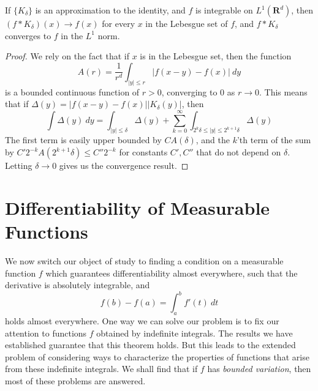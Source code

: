 \begin{theorem}
    If $\{ K_\delta \}$ is an approximation to the identity, and $f$ is integrable on $L^1(\mathbf{R}^d)$, then $(f * K_\delta)(x) \to f(x)$ for every $x$ in the Lebesgue set of $f$, and $f * K_\delta$ converges to $f$ in the $L^1$ norm.
\end{theorem}
\begin{proof}
    We rely on the fact that if $x$ is in the Lebesgue set, then the function
    \[ A(r) = \frac{1}{r^d} \int_{|y| \leq r} |f(x-y) - f(x)|\ dy \]
    is a bounded continuous function of $r > 0$, converging to $0$ as $r \to 0$. This means that if $\Delta(y) = |f(x-y) - f(x)| |K_\delta(y)|$, then
    \[ \int \Delta(y)\ dy = \int_{|y| \leq \delta} \Delta(y) + \sum_{k = 0}^\infty \int_{2^k \delta \leq |y| \leq 2^{k+1} \delta} \Delta(y) \]
    The first term is easily upper bounded by $CA(\delta)$, and the $k$'th term of the sum by $C'2^{-k}A(2^{k+1}\delta) \leq C''2^{-k}$ for constants $C',C''$ that do not depend on $\delta$. Letting $\delta \to 0$ gives us the convergence result.
\end{proof}

\section{Differentiability of Measurable Functions}

We now switch our object of study to finding a condition on a measurable function $f$ which guarantees differentiability almost everywhere, such that the derivative is absolutely integrable, and
%
\[ f(b) - f(a) = \int_a^b f'(t)\ dt \]
%
holds almost everywhere. One way we can solve our problem is to fix our attention to functions $f$ obtained by indefinite integrals. The results we have established guarantee that this theorem holds. But this leads to the extended problem of considering ways to characterize the properties of functions that arise from these indefinite integrals. We shall find that if $f$ has {\it bounded variation}, then most of these problems are answered.


